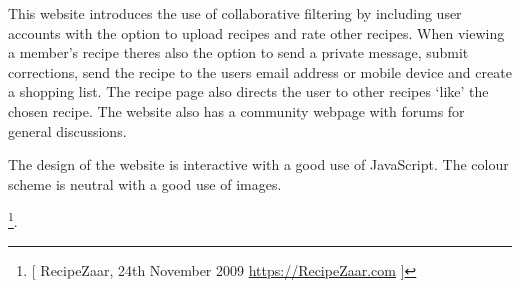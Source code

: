 This website introduces the use of collaborative filtering by including user accounts with the option to upload recipes and rate other recipes. When viewing a member’s recipe theres also the option to send a private message, submit corrections, send the recipe to the users email address or mobile device and create a shopping list. The recipe page also directs the user to other recipes ‘like’ the chosen recipe. The website also has a community webpage with forums for general discussions. 

The design of the website is interactive with a good use of JavaScript. The colour scheme is neutral with a good use of images.


\footnote{[ RecipeZaar, 24th November 2009 \url{https://RecipeZaar.com} ]}.
